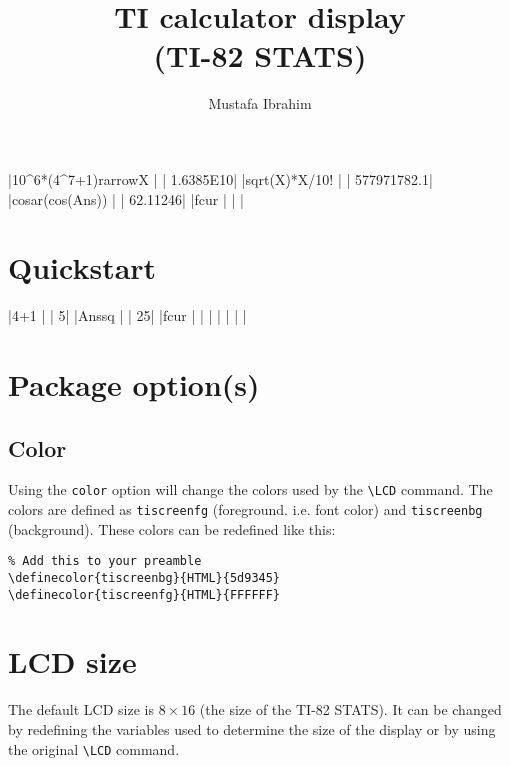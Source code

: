 \documentclass[a4paper,12pt]{article}
\title{TI calculator display\\{\small(TI-82 STATS)}}
\author{Mustafa Ibrahim}
\newcommand{\LCDcmd}{\texttt{\textbackslash LCD}}
\begin{document}
\maketitle

\begin{center}
\tiscreen
|10^6*(4^7+1){rarrow}X  |
|       1.6385E10|
|{sqrt}(X)*X/10!      |
|     577971782.1|
|cos{ar}(cos(Ans))  |
|        62.11246|
|{fcur}               |
|                |
\end{center}

\tableofcontents\newpage

\section{Quickstart}

\begin{SideBySideExample}[xrightmargin=6cm]

\tiscreen
|4+1             |
|               5|
|Ans{sq}         |
|              25|
|{fcur}          |
|                |
|                |
|                |
\end{SideBySideExample}

\section{Package option(s)}
\subsection{Color}

Using the \texttt{color} option will change the colors used by the \LCDcmd{}
command. The colors are defined as \texttt{tiscreenfg} (foreground. i.e. font
color) and \texttt{tiscreenbg} (background). These colors can be redefined like
this:

\begin{Verbatim}
% Add this to your preamble
\definecolor{tiscreenbg}{HTML}{5d9345}
\definecolor{tiscreenfg}{HTML}{FFFFFF}
\end{Verbatim}

\section{LCD size}

The default LCD size is $8 \times 16$ (the size of the TI-82 STATS). It can be
changed by redefining the variables used to determine the size of the display
or by using the original \LCDcmd{} command.
\end{document}
